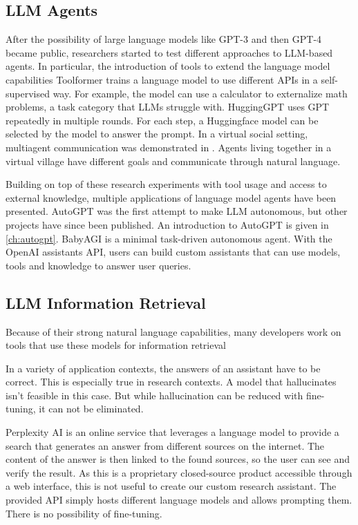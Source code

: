 \documentclass[../main.tex]{subfiles}
\begin{document}
\subsection{LLM Agents}

After the possibility of large language models like GPT-3 and then GPT-4 became public,
researchers started to test different approaches to LLM-based agents.
In particular, the introduction of tools to extend the language model capabilities
Toolformer \cite{Schick2023} trains a language model to use different APIs in a self-supervised way.
For example, the model can use a calculator to externalize math problems,
a task category that LLMs struggle with.
HuggingGPT \cite{Shen2023} uses GPT repeatedly in multiple rounds.
For each step, a Huggingface model can be selected by the model to answer the prompt.
In a virtual social setting, multiagent communication was demonstrated in \autocite{Park2023}.
Agents living together in a virtual village have different goals and communicate through natural language.

Building on top of these research experiments with tool usage and access to external knowledge,
multiple applications of language model agents have been presented.
AutoGPT \cite{SignificantGravitas2024} was the first attempt to make LLM autonomous,
but other projects have since been published.
An introduction to AutoGPT is given in \autoref{ch:autogpt}.
BabyAGI \cite{Nakajima2024} is a minimal task-driven autonomous agent.
With the OpenAI assistants \cite{zotero-195} API,
users can build custom assistants
that can use models, tools and knowledge to answer user queries.


\subsection{LLM Information Retrieval}

Because of their strong natural language capabilities,
many developers work on tools that use these models for information retrieval

In a variety of application contexts,
the answers of an assistant have to be correct.
This is especially true in research contexts.
A model that hallucinates isn't feasible in this case.
But while hallucination can be reduced with fine-tuning,
it can not be eliminated.

Perplexity AI \cite{zotero-197} is an online service that leverages a language model
to provide a search that generates an answer from different sources on the internet.
The content of the answer is then linked to the found sources,
so the user can see and verify the result.
As this is a proprietary closed-source product accessible through a web interface,
this is not useful to create our custom research assistant.
The provided API simply hosts different language models and allows prompting them.
There is no possibility of fine-tuning.
\end{document}

